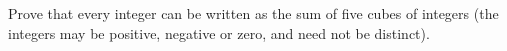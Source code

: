 Prove that every integer can be written as the sum of five cubes of integers (the integers may be positive, negative or zero, and need not be distinct).
